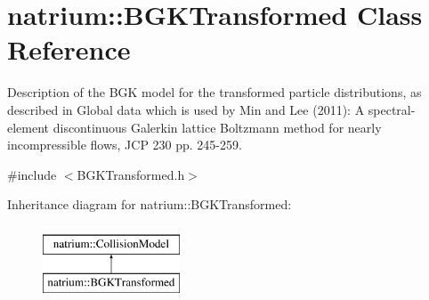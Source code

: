 \hypertarget{classnatrium_1_1BGKTransformed}{\section{natrium\-:\-:B\-G\-K\-Transformed Class Reference}
\label{classnatrium_1_1BGKTransformed}
}


Description of the B\-G\-K model for the transformed particle distributions, as described in Global data which is used by Min and Lee (2011)\-: A spectral-\/element discontinuous Galerkin lattice Boltzmann method for nearly incompressible flows, J\-C\-P 230 pp. 245-\/259.  




{\ttfamily \#include $<$B\-G\-K\-Transformed.\-h$>$}

Inheritance diagram for natrium\-:\-:B\-G\-K\-Transformed\-:\begin{figure}[H]
\begin{center}
\leavevmode
\includegraphics[height=2.000000cm]{classnatrium_1_1BGKTransformed}
\end{center}
\end{figure}
